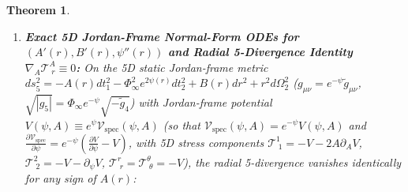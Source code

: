 \documentclass[11pt,a4paper]{article}
\newcommand{\catD}{\text{\textbf{\textcolor{blue!75!black}{[D]}}}}
\theoremstyle{definition}
\theoremstyle{plain}
\newtheorem{theorem}[axiom]{Theorem}
\theoremstyle{remark}
\begin{document}
\begin{theorem}
\begin{enumerate}[label=(\alph*)]
  \begin{align}
  \int_{r_h}^{\infty} r^2\,\frac{\mathcal{A}_E(r)}{\mathcal{B}(r)}\left[\left(\psi'(r)\right)^2 + m_\psi^2\,\mathcal{B}(r)^2\,\psi(r)\,\Pi_2'(\psi)\right]dr &= 0 \nonumber \\[3pt]
  \Longrightarrow\quad \psi(r) \equiv 0 \quad \left(\left.\psi'(r_h)\right|_{\partial_{\mathcal{A}}\mathcal{V}_{\mathrm{spec}}=0} = 0\right) &\;\;\catD, \label{eq:c5_bekenstein_integral_identity}
  \end{align}
  whereas when $\frac{\partial\mathcal{V}_{\mathrm{spec}}(\psi, \mathcal{A})}{\partial\mathcal{A}} = -\psi'_t(\mathcal{A})\frac{\partial\mathcal{V}_{\mathrm{spec}}}{\partial\psi} \not\equiv 0$ in Eq.~\eqref{eq:c4_shifted_potential} (with $\mathcal{A}(r) = e^{-\psi(r)}\mathcal{A}_E(r)^2$), the equilibrium root $\psi_t(\mathcal{A}(r))$ varies continuously with radius from $\psi_t(0) = \psi_0 > 0$ at the horizon ($\mathcal{A}(r_h) = 0$) to $\psi_t(1) = \psi_\infty = 0$ at spatial infinity ($\mathcal{A}(\infty) = 1$). Because no single constant shift $\psi \mapsto \psi - \mathrm{const}$ can simultaneously center the potential at both $r = r_h$ and $r = \infty$, the effective source integrand factors as $(\psi(r) - \psi_\infty)\left(\frac{\partial\mathcal{V}_{\mathrm{spec}}}{\partial\psi} - \mathcal{A}\frac{\partial\mathcal{V}_{\mathrm{spec}}}{\partial\mathcal{A}}\right) = (\psi(r) - \psi_\infty)\left[1 + \mathcal{A}(r)\psi'_t(\mathcal{A}(r))\right]\frac{\partial\mathcal{V}_{\mathrm{spec}}}{\partial\psi} \simeq \frac{3}{2}m_\psi^2\,\psi(r)\left[\psi(r) - \psi_t(\mathcal{A}(r))\right]\!\left[1 + \mathcal{A}(r)\psi'_t(\mathcal{A}(r))\right]$ (where $1 + \mathcal{A}\psi'_t(\mathcal{A}) \ge 1 - 2\psi_0/e > 0$ is strictly positive), changing sign across $[r_h, \infty)$ whenever $0 < \psi(r) < \psi_t(\mathcal{A}(r))$ and evading Bekenstein's global sign obstruction in Eq.~\eqref{eq:c5_bekenstein_integral_identity} \catD.
  \item \textbf{Exact 5D Jordan-Frame Normal-Form ODEs for $(A'(r), B'(r), \psi''(r))$ and Radial 5-Divergence Identity $\nabla_A\mathcal{T}^A_{\;r} \equiv 0$:}
  On the 5D static Jordan-frame metric $ds_5^2 = -A(r)dt_1^2 - \Phi_\infty^2 e^{2\psi(r)}dt_2^2 + B(r)dr^2 + r^2 d\Omega_2^2$ ($g_{\mu\nu} = e^{-\psi}\tilde{g}_{\mu\nu}$, $\sqrt{|g_5|} = \Phi_\infty e^{-\psi}\sqrt{-\tilde{g}_4}$) with Jordan-frame potential $V(\psi, A) \equiv e^{\psi}\mathcal{V}_{\mathrm{spec}}(\psi, A)$ (so that $\mathcal{V}_{\mathrm{spec}}(\psi, A) = e^{-\psi}V(\psi, A)$ and $\frac{\partial\mathcal{V}_{\mathrm{spec}}}{\partial\psi} = e^{-\psi}(\frac{\partial V}{\partial\psi} - V)$, with 5D stress components $\mathcal{T}^1_{\;1} = -V - 2A\partial_A V$, $\mathcal{T}^2_{\;2} = -V - \partial_\psi V$, $\mathcal{T}^r_{\;r} = \mathcal{T}^\theta_{\;\theta} = -V$), the radial 5-divergence vanishes identically for any sign of $A(r)$:

\end{enumerate}
\end{theorem}
\end{document}
